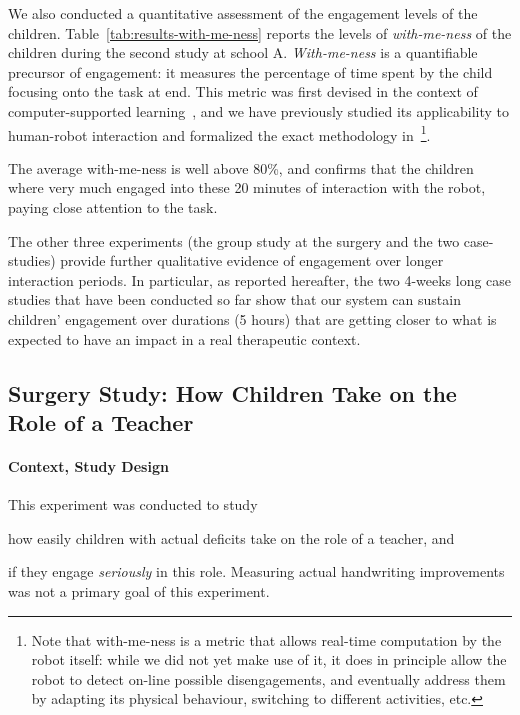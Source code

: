 \documentclass{article}
\begin{document}
We also conducted a quantitative assessment of the engagement levels of the
children. Table~\ref{tab:results-with-me-ness} reports the levels of
\emph{with-me-ness} of the children during the second study at school A.
\emph{With-me-ness} is a quantifiable precursor of engagement: it measures the
percentage of time spent by the child focusing onto the task at end. This metric
was first devised in the context of computer-supported
learning~\cite{sharma2014me}, and we have previously studied its applicability
to human-robot interaction and formalized the exact methodology
in~\cite{lemaignan2016realtime}\footnote{Note that with-me-ness is a metric that
allows real-time computation by the robot itself: while we did not yet make
use of it, it does in principle allow the robot to detect on-line possible
disengagements, and eventually address them by adapting its physical
behaviour, switching to different activities, etc.}.

The average with-me-ness is well above 80\%, and confirms that the children
where very much engaged into these 20 minutes of interaction with the robot,
paying close attention to the task.

The other three experiments (the group study at the surgery and the two
case-studies) provide further qualitative evidence of engagement over longer
interaction periods. In particular, as reported hereafter, the two 4-weeks long
case studies that have been conducted so far show that our system can sustain
children' engagement over durations (5 hours) that are getting closer to what is
expected to have an impact in a real therapeutic context.

\subsection{Surgery Study: How Children Take on the Role of a Teacher}\label{normandie}

\paragraph{Context, Study Design}

\begin{inparaenum}[\itshape 1\upshape)]
This experiment was conducted to study \item how easily children with actual
deficits take on the role of a teacher, and \item if they engage
\emph{seriously} in this role. Measuring actual handwriting improvements was
not a primary goal of this experiment.
\end{inparaenum}
\end{document}
